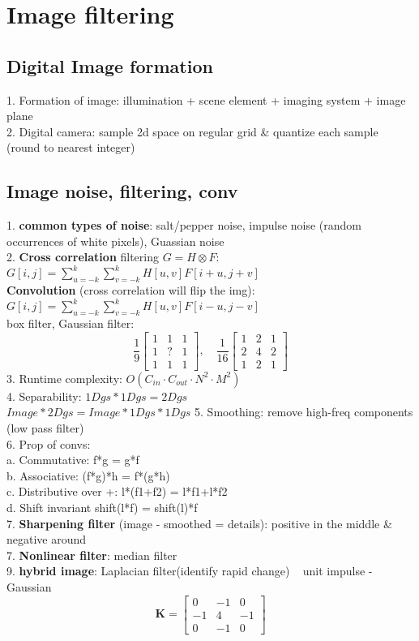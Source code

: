 \section{Image filtering}
\subsection*{Digital Image formation}
1. Formation of image: illumination + scene element + imaging system + image plane\\
2. Digital camera: sample 2d space on regular grid \& quantize each sample (round to nearest integer)
\subsection*{Image noise, filtering, conv}
1. \textbf{common types of noise}: salt/pepper noise, impulse noise (random occurrences of white pixels), Guassian noise\\
2. \textbf{Cross correlation} filtering $G=H\otimes F$: \\
$G[i,j] = \sum_{u=-k}^{k} \sum_{v=-k}^{k} H[u, v] F[i+u, j+v]$ \\
\textbf{Convolution} (cross correlation will flip the img):\\
$G[i,j] = \sum_{u=-k}^{k} \sum_{v=-k}^{k} H[u, v] F[i-u, j-v]$\\
box filter, \quad Gaussian filter:
\[
 \frac{1}{9}
\begin{bmatrix}
 1 & 1&1 \\
 1&?&1 \\
 1&1&1
\end{bmatrix}, \quad
\frac{1}{16}
\begin{bmatrix}
 1&2&1 \\
 2&4&2 \\
 1&2&1
\end{bmatrix}
\]
3. Runtime complexity: 
$O(C_{in} \cdot C_{out} \cdot N^2 \cdot M^2)
$ \\
4. Separability:  
$1D gs * 1D gs = 2D gs$\\
$Image * 2D gs = Image * 1D gs * 1D gs$
5. Smoothing: remove high-freq components (low pass filter) \\
6. Prop of convs:\\
a. Commutative: f*g = g*f \\
b. Associative: (f*g)*h = f*(g*h) \\
c. Distributive over +: l*(f1+f2) = l*f1+l*f2 \\
d. Shift invariant shift(l*f) = shift(l)*f \\
7. \textbf{Sharpening filter} (image - smoothed =  details):
positive in the middle \& negative around \\
7. \textbf{Nonlinear filter}: median filter \\
9.\textbf{ hybrid image}: 
Laplacian filter(identify rapid change) ~ unit impulse - Gaussian
\[
\mathbf{K} = 
\begin{bmatrix}
0 & -1 & 0 \\
-1 & 4 & -1 \\
0 & -1 & 0
\end{bmatrix}
\]
